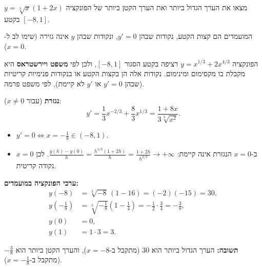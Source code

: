 
\begin{question}
מצאו את הערך הגדול ביותר ואת הערך הקטן ביותר של הפונקציה $y=\sqrt[3]{x}(1+2x)$ בקטע $[-8,1]$.
\end{question}

\begin{hint}
המועמדים הם קצות הקטע, נקודות שבהן $y'=0$, ונקודות שבהן $y$ אינה גזירה (שימו לב ל-$x=0$).
\end{hint}

\begin{solution}
הפונקציה $y=x^{1/3}+2x^{4/3}$ רציפה בקטע הסגור $[-8,1]$, ולכן לפי \textbf{משפט ויירשטראס} היא מקבלת בו מקסימום ומינימום. נקודות אלה הן בקצות הקטע או בנקודות פנימיות קריטיות (שבהן $y'=0$ או $y'$ לא קיימת), לפי משפט פרמה.

\textbf{נגזרת} (עבור $x\ne0$):
\[ y' = \frac13x^{-2/3}+\frac83x^{1/3} = \frac{1+8x}{3\sqrt[3]{x^2}}. \]
\begin{itemize}
  \item $y'=0\iff x=-\frac18\in(-8,1)$.
  \item ב-$x=0$ הנגזרת אינה קיימת: $\frac{y(h)-y(0)}{h}=\frac{h^{1/3}(1+2h)}{h}=\frac{1+2h}{h^{2/3}}\to+\infty$. לכן $x=0$ נקודה קריטית.
\end{itemize}

\textbf{ערכי הפונקציה במועמדים:}
\begin{align*}
y(-8) &= \sqrt[3]{-8}\,(1-16) = (-2)(-15) = 30,\\
y\left(-\tfrac18\right) &= \sqrt[3]{-\tfrac18}\left(1-\tfrac14\right) = -\tfrac12\cdot\tfrac34 = -\tfrac38,\\
y(0) &= 0,\\
y(1) &= 1\cdot 3 = 3.
\end{align*}

\textbf{תשובה:} הערך הגדול ביותר הוא $30$ (מתקבל ב-$x=-8$), והערך הקטן ביותר הוא $-\frac38$ (מתקבל ב-$x=-\frac18$).
\end{solution}
